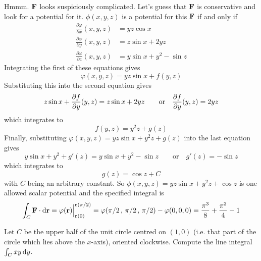 \begin{solution} 
Hmmm. $\mathbf{F}$ looks suspiciously complicated. Let's
guess that $\mathbf{F}$ is conservative and look for a potential for it.
$\phi(x,y,z)$ is a potential for this $\mathbf{F}$ if and only if
\begin{align*}
\frac{\partial \varphi}{\partial x}(x,y,z) &= yz\cos x \\
\frac{\partial \varphi}{\partial y}(x,y,z) &= z\sin x+2yz \\
\frac{\partial \varphi}{\partial z}(x,y,z) &= y\sin x+y^2-\sin z
\end{align*}
Integrating the first of these equations gives
\begin{equation*}
\varphi(x,y,z) = yz\sin x + f(y,z)
\end{equation*}
Substituting this into the second equation gives 
\begin{equation*}
z\sin x + \pdiff{f}{y}(y,z) 
= z\sin x+2yz\qquad\text{or}\quad
\pdiff{f}{y}(y,z) = 2yz
\end{equation*}
which integrates to
\begin{equation*}
f(y,z) = y^2z + g(z)
\end{equation*}
Finally, substituting $\varphi(x,y,z) = yz\sin x+y^2z + g(z)$
into the last equation gives
\begin{equation*}
y\sin x+y^2 + g'(z) 
= y\sin x+y^2-\sin z\qquad\text{or}\quad
g'(z) = -\sin z
\end{equation*}
which integrates to
\begin{equation*}
g(z) = \cos z + C
\end{equation*}
with $C$ being an arbitrary constant.
So $\phi(x,y,z)=yz\sin x+y^2z+\cos z$ is one allowed scalar potential
and the specified integral is
\begin{align*}
\int_C\mathbf{F}\cdot\mathrm{d}\mathbf{r} = \varphi(\mathbf{r})\Big|_{\mathbf{r}(0)}^{\mathbf{r}(\pi/2)}
= \varphi(\pi/2\,,\,\pi/2\,,\,\pi/2) -\varphi (0,0,0)
= \frac{\pi^3}{8}+\frac{\pi^2}{4}-1
\end{align*}

\end{solution}


\begin{question}[M317 2010D]    %
Let $C$ be the upper half of the unit circle centred on $(1, 0)$ 
(i.e. that part of the circle which lies above the $x$-axis), 
oriented clockwise. Compute the line integral
$\int_C xy\,\mathrm{d}y$.
\end{question}

